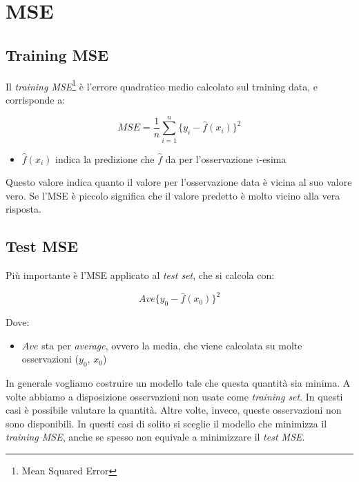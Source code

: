 \section{MSE}

\subsection{Training MSE}
Il \textit{training MSE}\footnote{Mean Squared Error} \`e l'errore quadratico 
medio calcolato sul training data, e corrisponde a:

\[ MSE = \frac{1}{n} \sum_{i=1}^n \{y_i - \hat{f}(x_i)\}^2 \]

\begin{itemize}
 \item $\hat{f}(x_i)$ indica la predizione che $\hat{f}$ da per l'osservazione 
$i$-esima
\end{itemize}


Questo valore indica quanto il valore per l'osservazione data \`e vicina al suo 
valore vero. Se l'MSE \`e piccolo significa che il valore predetto \`e molto 
vicino alla vera risposta.

\subsection{Test MSE}

Pi\`u importante \`e l'MSE applicato al \textit{test set}, che si calcola con:

\[ Ave\{y_0 - \hat{f}(x_0)\}^2 \]

Dove:
\begin{itemize}
 \item $Ave$ sta per \textit{average}, ovvero la media, che viene calcolata su 
molte osservazioni ($y_0$, $x_0$)
\end{itemize}

In generale vogliamo costruire un modello tale che questa quantit\`a sia minima. A volte abbiamo a disposizione osservazioni non usate come \textit{training set}. In questi casi \`e possibile valutare la quantit\`a. Altre volte, invece, queste osservazioni non sono disponibili. In questi casi di solito si sceglie il modello che minimizza il \textit{training MSE}, anche se spesso non equivale a minimizzare il \textit{test MSE}.
